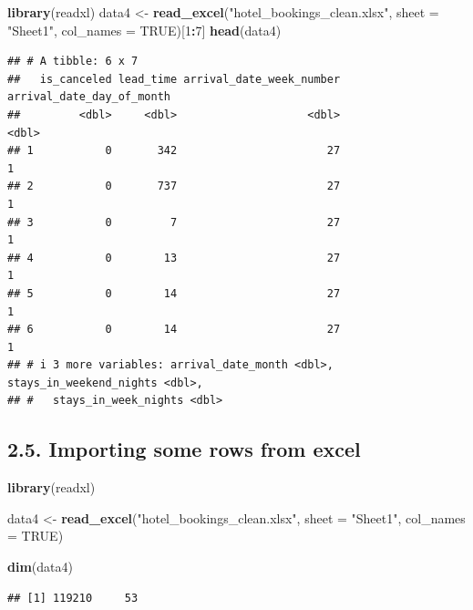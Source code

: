 \documentclass[
]{article}
\newenvironment{Shaded}{\begin{snugshade}}{\end{snugshade}}
\newcommand{\AttributeTok}[1]{\textcolor[rgb]{0.13,0.29,0.53}{#1}}
\newcommand{\ConstantTok}[1]{\textcolor[rgb]{0.56,0.35,0.01}{#1}}
\newcommand{\DecValTok}[1]{\textcolor[rgb]{0.00,0.00,0.81}{#1}}
\newcommand{\FunctionTok}[1]{\textcolor[rgb]{0.13,0.29,0.53}{\textbf{#1}}}
\newcommand{\NormalTok}[1]{#1}
\newcommand{\OtherTok}[1]{\textcolor[rgb]{0.56,0.35,0.01}{#1}}
\newcommand{\SpecialCharTok}[1]{\textcolor[rgb]{0.81,0.36,0.00}{\textbf{#1}}}
\newcommand{\StringTok}[1]{\textcolor[rgb]{0.31,0.60,0.02}{#1}}
\begin{document}
\begin{Shaded}
\begin{Highlighting}[]
\FunctionTok{library}\NormalTok{(readxl)}
\NormalTok{data4 }\OtherTok{\textless{}{-}} \FunctionTok{read\_excel}\NormalTok{(}\StringTok{"hotel\_bookings\_clean.xlsx"}\NormalTok{, }\AttributeTok{sheet =} \StringTok{"Sheet1"}\NormalTok{, }\AttributeTok{col\_names =} \ConstantTok{TRUE}\NormalTok{)[}\DecValTok{1}\SpecialCharTok{:}\DecValTok{7}\NormalTok{]}
\FunctionTok{head}\NormalTok{(data4)}
\end{Highlighting}
\end{Shaded}

\begin{verbatim}
## # A tibble: 6 x 7
##   is_canceled lead_time arrival_date_week_number arrival_date_day_of_month
##         <dbl>     <dbl>                    <dbl>                     <dbl>
## 1           0       342                       27                         1
## 2           0       737                       27                         1
## 3           0         7                       27                         1
## 4           0        13                       27                         1
## 5           0        14                       27                         1
## 6           0        14                       27                         1
## # i 3 more variables: arrival_date_month <dbl>, stays_in_weekend_nights <dbl>,
## #   stays_in_week_nights <dbl>
\end{verbatim}

\hypertarget{importing-some-rows-from-excel}{%
\subsection{2.5. Importing some rows from
excel}\label{importing-some-rows-from-excel}}

\begin{Shaded}
\begin{Highlighting}[]
\FunctionTok{library}\NormalTok{(readxl)}

\NormalTok{data4 }\OtherTok{\textless{}{-}} \FunctionTok{read\_excel}\NormalTok{(}\StringTok{"hotel\_bookings\_clean.xlsx"}\NormalTok{, }\AttributeTok{sheet =} \StringTok{"Sheet1"}\NormalTok{, }\AttributeTok{col\_names =} \ConstantTok{TRUE}\NormalTok{)}

\FunctionTok{dim}\NormalTok{(data4)}
\end{Highlighting}
\end{Shaded}

\begin{verbatim}
## [1] 119210     53
\end{verbatim}
\end{document}
